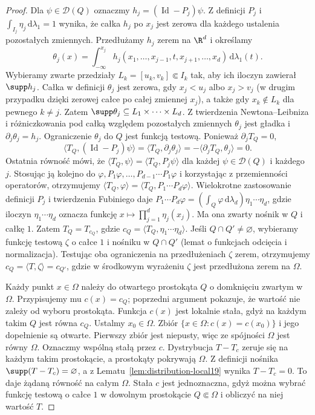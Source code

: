\begin{proof}
Dla $\psi\in\mathcal D(Q)$ oznaczmy
$h_j=(\operatorname{Id}-P_j)\psi$.
Z definicji $P_j$ i $\int_{I_j}\eta_j\,\mathrm d\lambda_1=1$
wynika, że całka $h_j$ po $x_j$ jest zerowa dla każdego
ustalenia pozostałych zmiennych.
Przedłużamy $h_j$ zerem na $\R^d$ i określamy
\[
\theta_j(x)=\int_{-\infty}^{x_j}
h_j(x_1,\ldots,x_{j-1},t,x_{j+1},\ldots,x_d)\,
\mathrm d\lambda_1(t).
\]
Wybieramy zwarte przedziały $L_k=[u_k,v_k]\Subset I_k$
tak, aby ich iloczyn zawierał $\supp h_j$.
Całka w definicji $\theta_j$ jest zerowa, gdy
$x_j<u_j$ albo $x_j>v_j$ (w drugim przypadku dzięki
zerowej całce po całej zmiennej $x_j$), a także gdy
$x_k\notin L_k$ dla pewnego $k\ne j$.
Zatem $\supp\theta_j\subseteq L_1\times\cdots\times L_d$.
Z twierdzenia Newtona--Leibniza i różniczkowania pod całką
względem pozostałych zmiennych $\theta_j$ jest gładka i
$\partial_j\theta_j=h_j$. Ograniczenie $\theta_j$ do $Q$
jest funkcją testową. Ponieważ $\partial_jT_Q=0$,
\[
\langle T_Q,(\operatorname{Id}-P_j)\psi\rangle
=\langle T_Q,\partial_j\theta_j\rangle
=-\langle\partial_jT_Q,\theta_j\rangle=0.
\]
Ostatnia równość mówi, że
$\langle T_Q,\psi\rangle=\langle T_Q,P_j\psi\rangle$
dla każdej $\psi\in\mathcal D(Q)$ i każdego $j$.
Stosując ją kolejno do $\varphi,P_1\varphi,\ldots,
P_{d-1}\cdots P_1\varphi$ i korzystając z przemienności
operatorów, otrzymujemy
$\langle T_Q,\varphi\rangle=\langle T_Q,P_1\cdots P_d\varphi\rangle$.
Wielokrotne zastosowanie definicji $P_j$ i twierdzenia
Fubiniego daje
$P_1\cdots P_d\varphi=(\int_Q\varphi\,\mathrm d\lambda_d)
\eta_1\cdots\eta_d$, gdzie iloczyn $\eta_1\cdots\eta_d$
oznacza funkcję $x\mapsto\prod_{j=1}^d\eta_j(x_j)$.
Ma ona zwarty nośnik w $Q$ i całkę $1$.
Zatem $T_Q=T_{c_Q}$, gdzie
$c_Q=\langle T_Q,\eta_1\cdots\eta_d\rangle$.
Jeśli $Q\cap Q'\ne\varnothing$, wybieramy funkcję testową
$\zeta$ o całce $1$ i nośniku w $Q\cap Q'$ (lemat o
funkcjach odcięcia i normalizacja). Testując oba ograniczenia
na przedłużeniach $\zeta$ zerem, otrzymujemy
$c_Q=\langle T,\zeta\rangle=c_{Q'}$, gdzie w środkowym
wyrażeniu $\zeta$ jest przedłużona zerem na $\Omega$.

Każdy punkt $x\in\Omega$ należy do otwartego prostokąta
$Q$ o domknięciu zwartym w $\Omega$. Przypisujemy mu
$c(x)=c_Q$; poprzedni argument pokazuje, że wartość nie
zależy od wyboru prostokąta. Funkcja $c(x)$ jest lokalnie
stała, gdyż na każdym takim $Q$ jest równa $c_Q$.
Ustalmy $x_0\in\Omega$. Zbiór
$\{x\in\Omega:c(x)=c(x_0)\}$ i jego dopełnienie są otwarte.
Pierwszy zbiór jest niepusty, więc ze spójności $\Omega$
jest równy $\Omega$. Oznaczmy wspólną stałą przez $c$.
Dystrybucja $T-T_c$ zeruje się na każdym takim prostokącie,
a prostokąty pokrywają $\Omega$. Z definicji nośnika
$\supp(T-T_c)=\varnothing$, a z Lematu~\ref{lem:distribution-local19}
wynika $T-T_c=0$. To daje żądaną równość na całym $\Omega$.
Stała $c$ jest jednoznaczna, gdyż można wybrać funkcję
testową o całce $1$ w dowolnym prostokącie $Q\Subset\Omega$
i obliczyć na niej wartość $T$.
\end{proof}

